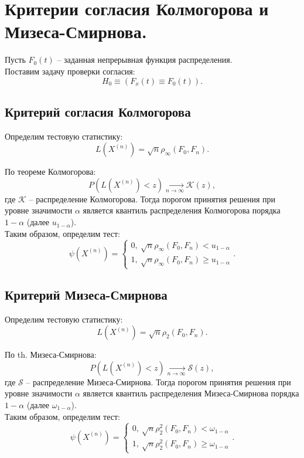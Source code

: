 \section{Критерии согласия Колмогорова и Мизеса-Смирнова.}

Пусть $F_0(t)$ -- заданная непрерывная функция распределения.\\

Поставим задачу проверки согласия:
\[
  H_0 \equiv (F_x(t) \equiv F_0(t))
.\]

\subsection{Критерий согласия Колмогорова}

Определим тестовую статистику:
\[
    L(X^{(n)}) = \sqrt{n} \rho_{\infty}(F_0, F_n)
.\]

По теореме Колмогорова:
\[
    P(L(X^{(n)}) < z) \xrightarrow[n \to \infty]{} \mathcal{K}(z)
,\]
где $\mathcal{K}$ -- распределение Колмогорова.
Тогда порогом принятия решения при уровне значимости $\alpha$ является
квантиль распределения Колмогорова порядка $1 - \alpha$
(далее $u_{1 - \alpha}$).\\

Таким образом, определим тест:
\[
    \psi(X^{(n)}) = \begin{cases}
    0,~ \sqrt{n} \rho_{\infty}(F_0, F_n) < u_{1 - \alpha}\\
    1,~ \sqrt{n} \rho_{\infty}(F_0, F_n) \geqslant u_{1 - \alpha}
  \end{cases}
.\]

\subsection{Критерий Мизеса-Смирнова}

Определим тестовую статистику:
\[
    L(X^{(n)}) = \sqrt{n} \rho_{2}(F_0, F_n)
.\]

По th. Мизеса-Смирнова:
\[
    P(L(X^{(n)}) < z) \xrightarrow[n \to \infty]{} \mathcal{S}(z)
,\]
где $\mathcal{S}$ -- распределение Мизеса-Смирнова.
Тогда порогом принятия решения при уровне значимости $\alpha$ является
квантиль распределения Мизеса-Смирнова порядка $1 - \alpha$
(далее $\omega_{1 - \alpha}$).\\

Таким образом, определим тест:
\[
    \psi(X^{(n)}) = \begin{cases}
    0,~ \sqrt{n} \rho_{2}^{2}(F_0, F_n) < \omega_{1 - \alpha}\\
    1,~ \sqrt{n} \rho_{2}^{2}(F_0, F_n) \geqslant \omega_{1 - \alpha}
  \end{cases}
.\]

